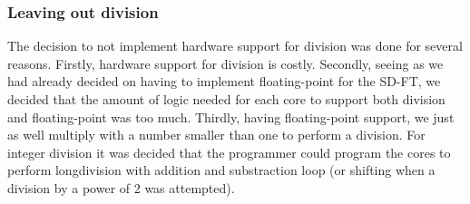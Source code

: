 \subsubsection{Leaving out division}\label{subsubsection:fpga-alu-div}

The decision to not implement hardware support for division was done for several
reasons. Firstly, hardware support for division is costly. Secondly, seeing as
we had already decided on having to implement floating-point for the SD-FT, we
decided that the amount of logic needed for each core to support both division
and floating-point was too much. Thirdly, having floating-point support, we
just as well multiply with a number smaller than one to perform a division. For
integer division it was decided that the programmer could program the cores to
perform longdivision with addition and substraction loop (or shifting when a
division by a power of 2 was attempted).
